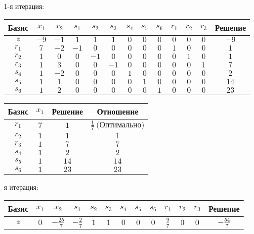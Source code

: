 \documentclass{article}%
\begin{document}
\begin{flushleft}%
1{-}я итерация: %
\newline%
\newline%
\renewcommand{\arraystretch}{1.3}%
\begin{tabular}{|c|ccccccccccc|c|}%
\hline%
Базис&$x_{1}$&$x_{2}$&$s_{1}$&$s_{2}$&$s_{3}$&$s_{4}$&$s_{5}$&$s_{6}$&$r_{1}$&$r_{2}$&$r_{3}$&Решение\\%
\hline%
$z$&$-9$&$-1$&$1$&$1$&$1$&$0$&$0$&$0$&$0$&$0$&$0$&$-9$\\%
\hline%
$r_{1}$&$7$&$-2$&$-1$&$0$&$0$&$0$&$0$&$0$&$1$&$0$&$0$&$1$\\%
$r_{2}$&$1$&$0$&$0$&$-1$&$0$&$0$&$0$&$0$&$0$&$1$&$0$&$1$\\%
$r_{3}$&$1$&$3$&$0$&$0$&$-1$&$0$&$0$&$0$&$0$&$0$&$1$&$7$\\%
$s_{4}$&$1$&$-2$&$0$&$0$&$0$&$1$&$0$&$0$&$0$&$0$&$0$&$2$\\%
$s_{5}$&$1$&$1$&$0$&$0$&$0$&$0$&$1$&$0$&$0$&$0$&$0$&$14$\\%
$s_{6}$&$1$&$2$&$0$&$0$&$0$&$0$&$0$&$1$&$0$&$0$&$0$&$23$\\%
\hline%
\end{tabular}%
\newline%
\newline%
\newline%
\begin{tabular}{|cccc|}%
\hline%
Базис&$x_{1}$&Решение&Отношение\\%
\hline%
$r_{1}$&$7$&$1$&$\frac{1}{7}\: \text{(Оптимально)}$\\%
$r_{2}$&$1$&$1$&$1$\\%
$r_{3}$&$1$&$7$&$7$\\%
$s_{4}$&$1$&$2$&$2$\\%
$s_{5}$&$1$&$14$&$14$\\%
$s_{6}$&$1$&$23$&$23$\\%
\hline%
\end{tabular}%
\newline%
\newline%
я итерация: %
\newline%
\newline%
\renewcommand{\arraystretch}{1.3}%
\begin{tabular}{|c|ccccccccccc|c|}%
\hline%
Базис&$x_{1}$&$x_{2}$&$s_{1}$&$s_{2}$&$s_{3}$&$s_{4}$&$s_{5}$&$s_{6}$&$r_{1}$&$r_{2}$&$r_{3}$&Решение\\%
\hline%
$z$&$0$&$-\frac{25}{7}$&$-\frac{2}{7}$&$1$&$1$&$0$&$0$&$0$&$\frac{9}{7}$&$0$&$0$&$-\frac{54}{7}$\\%

\end{tabular}
\end{flushleft}
\end{document}
